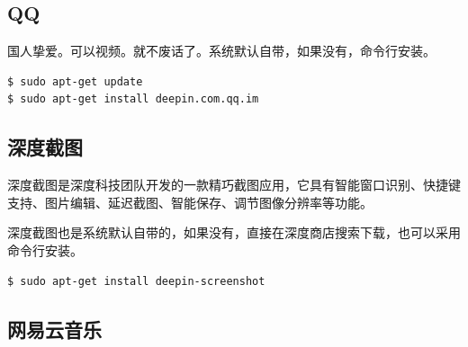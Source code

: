 \documentclass[doctor,openright,twoside]{sjtuthesis}
\theoremstyle{plain}
\theoremstyle{definition}
\theoremstyle{remark}
\theoremstyle{ocrenumbox}
\theoremstyle{plain}
\begin{document}
\hypertarget{qq}{%
\subsection{QQ}\label{qq}}

国人挚爱。可以视频。就不废话了。系统默认自带，如果没有，命令行安装。

\begin{lstlisting}[language=bash]
$ sudo apt-get update
$ sudo apt-get install deepin.com.qq.im
\end{lstlisting}

\subsection{深度截图}

深度截图是深度科技团队开发的一款精巧截图应用，它具有智能窗口识别、快捷键支持、图片编辑、延迟截图、智能保存、调节图像分辨率等功能。


深度截图也是系统默认自带的，如果没有，直接在深度商店搜索下载，也可以采用命令行安装。

\begin{lstlisting}[language=bash]
$ sudo apt-get install deepin-screenshot
\end{lstlisting}

\subsection{网易云音乐}
\end{document}
